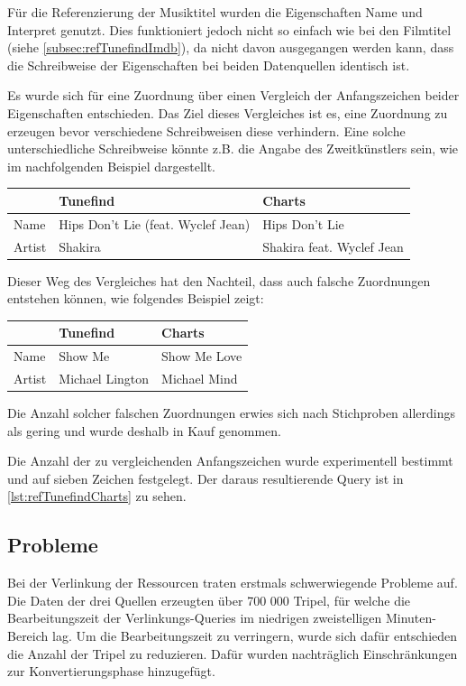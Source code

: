 \documentclass[parskip]{scrartcl}
\begin{document}
Für die Referenzierung der Musiktitel wurden die Eigenschaften Name und Interpret genutzt. Dies funktioniert jedoch nicht so einfach wie bei den Filmtitel (siehe \ref{subsec:refTunefindImdb}), da nicht davon ausgegangen werden kann, dass die Schreibweise der Eigenschaften bei beiden Datenquellen identisch ist.

Es wurde sich für eine Zuordnung über einen Vergleich der Anfangszeichen beider Eigenschaften entschieden. Das Ziel dieses Vergleiches ist es, eine Zuordnung zu erzeugen bevor verschiedene Schreibweisen diese verhindern. Eine solche unterschiedliche Schreibweise könnte z.B. die Angabe des Zweitkünstlers sein, wie im nachfolgenden Beispiel dargestellt.

\begin{tabular}{p{}|p{}|p{}}
     & \textbf{Tunefind} & \textbf{Charts} \\\hline
    Name & Hips Don't Lie (feat. Wyclef Jean)  & Hips Don't Lie\\
    Artist & Shakira & Shakira feat. Wyclef Jean\\
\end{tabular}

Dieser Weg des Vergleiches hat den Nachteil, dass auch falsche Zuordnungen entstehen können, wie folgendes Beispiel zeigt:

\begin{tabular}{p{}|p{}|p{}}
    & \textbf{Tunefind} & \textbf{Charts} \\\hline
    Name & Show Me  & Show Me Love\\
    Artist & Michael Lington & Michael Mind\\
\end{tabular}

Die Anzahl solcher falschen Zuordnungen erwies sich nach Stichproben allerdings als gering und wurde deshalb in Kauf genommen.

Die Anzahl der zu vergleichenden Anfangszeichen wurde experimentell bestimmt und auf sieben Zeichen festgelegt. Der daraus resultierende Query ist in \autoref{lst:refTunefindCharts} zu sehen.

\subsection{Probleme}
\label{subsec:problems}

Bei der Verlinkung der Ressourcen traten erstmals schwerwiegende Probleme auf. Die Daten der drei Quellen erzeugten über 700 000 Tripel, für welche die Bearbeitungszeit der Verlinkungs-Queries im niedrigen zweistelligen  Minuten-Bereich lag. Um die Bearbeitungszeit zu verringern, wurde sich dafür entschieden die Anzahl der Tripel zu reduzieren. Dafür wurden nachträglich Einschränkungen zur Konvertierungsphase hinzugefügt.
\end{document}
